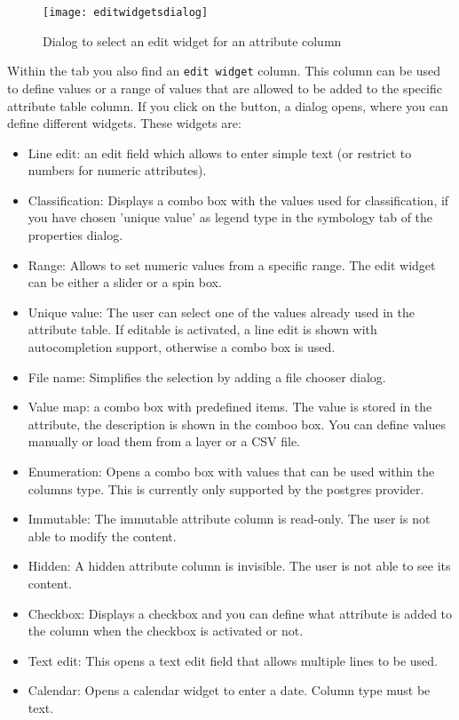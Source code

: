 
\begin{figure}[ht]
   \centering
   \texttt{[image: editwidgetsdialog]}
   \caption{Dialog to select an edit widget for an attribute column
\nixcaption}\label{fig:editwidget}
\end{figure}

Within the  tab you also find an \texttt{edit widget} column.
This column can be used to define values or a range of values that are
allowed
to be added to the specific attribute table column. If you click on the
 button, a dialog opens, where you can define different
widgets. These widgets are:

\begin{itemize}[label=--]
\item Line edit: an edit field which allows to enter simple text (or restrict
to
numbers for numeric attributes).
\item Classification: Displays a combo box with the values used for
classification, if you have chosen 'unique value' as legend type in the
symbology tab of the properties dialog.
\item Range: Allows to set numeric values from a specific range. The edit
widget can be either a slider or a spin box.
\item Unique value: The user can select one of the values already used in the
attribute table. If editable is activated, a line edit is shown with
autocompletion support, otherwise a combo box is used.
\item File name: Simplifies the selection by adding a file chooser dialog.
\item Value map: a combo box with predefined items. The value is stored in
the attribute, the description is shown in the comboo box. You can define
values manually or load them from a layer or a CSV file.
\item Enumeration: Opens a combo box with values that can be used within the
columns type. This is currently only supported by the postgres provider.
\item Immutable: The immutable attribute column is read-only. The user is not
able to modify the content.
\item Hidden: A hidden attribute column is invisible. The user is not able to 
see its content. 
\item Checkbox: Displays a checkbox and you can define what attribute is added 
to the column when the checkbox is activated or not.
\item Text edit: This opens a text edit field that allows multiple lines to be 
used. 
\item Calendar: Opens a calendar widget to enter a date. Column type must be text.
\end{itemize}

